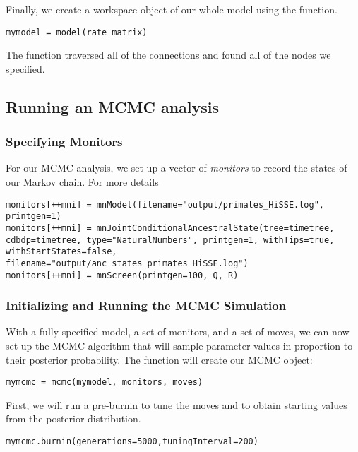 Finally, we create a workspace object of our whole model using the  function. 
{\tt \begin{snugshade*}
\begin{lstlisting}
mymodel = model(rate_matrix)
\end{lstlisting}
\end{snugshade*}}

The  function traversed all of the connections and found all of the nodes we specified. 


\subsection{Running an MCMC analysis}

\subsubsection{Specifying Monitors}

For our MCMC analysis, we set up a vector of \emph{monitors} to record the states of our Markov chain. 
For more details 
{\tt \begin{snugshade*}
\begin{lstlisting}
monitors[++mni] = mnModel(filename="output/primates_HiSSE.log", printgen=1)
monitors[++mni] = mnJointConditionalAncestralState(tree=timetree, cdbdp=timetree, type="NaturalNumbers", printgen=1, withTips=true, withStartStates=false, filename="output/anc_states_primates_HiSSE.log")
monitors[++mni] = mnScreen(printgen=100, Q, R)
\end{lstlisting}
\end{snugshade*}}

\subsubsection{Initializing and Running the MCMC Simulation}

With a fully specified model, a set of monitors, and a set of moves, we can now set up the MCMC algorithm that will sample parameter values in proportion to their posterior probability. 
The  function will create our MCMC object:
{\tt \begin{snugshade*}
\begin{lstlisting}
mymcmc = mcmc(mymodel, monitors, moves)
\end{lstlisting}
\end{snugshade*}}

First, we will run a pre-burnin to tune the moves and to obtain starting values from the posterior distribution.
{\tt \begin{snugshade*}
\begin{lstlisting}
mymcmc.burnin(generations=5000,tuningInterval=200)
\end{lstlisting}
\end{snugshade*}}

